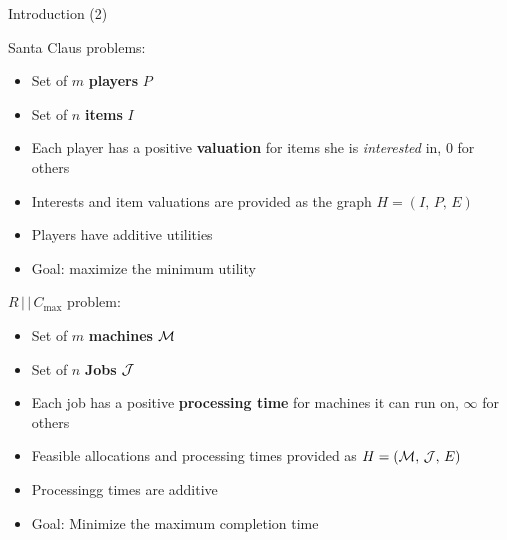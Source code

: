 \begin{frame}[t]{Introduction (2)}
    \begin{minipage}[t]{0.48\textwidth}
        Santa Claus problems:
        \begin{itemize}
            \item<2-> Set of $m$ \textbf{players} $P$
            \item<3-> Set of $n$ \textbf{items} $I$
            \item<4-> Each player has a positive \textbf{valuation} for items she is \emph{interested} in, 0 for others
            \item<5-> Interests and item valuations are provided as the graph $H = (I, \, P, \, E)$
            \item<6-> Players have additive utilities
            \item<7-> Goal: maximize the minimum utility
        \end{itemize}
    \end{minipage}    
    \begin{minipage}[t]{0.48\textwidth}
        $R \, | \, | \, C_{\max}$ problem:
        \begin{itemize}
            \item<8-> Set of $m$ \textbf{machines} $\mathcal{M}$
            \item<9-> Set of $n$ \textbf{Jobs} $\mathcal{J}$
            \item<10-> Each job has a positive \textbf{processing time} for machines it can run on, $\infty$ for others
            \item<11-> Feasible allocations and processing times provided as $H = (\mathcal{M}, \, \mathcal{J}, \, E)$
            \item<13-> Processingg times are additive
            \item<14-> Goal: Minimize the maximum completion time
        \end{itemize}
    \end{minipage}
\end{frame}

